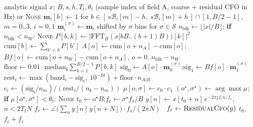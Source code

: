 \begin{algorithm}[H]
\caption{Float tone detector (\texttt{detect\_newman\_preamble}).}
\label{alg:tone_float}
\begin{algorithmic}[1]
\Require analytic signal $x$; $B, s, h, T_t, \theta_t$
\Ensure (sample index of field A, coarse $+$ residual CFO in Hz) or \textsc{None}
\State $\mathbf{m}_i[b] \gets 1$ for $b \in [\,s\mathcal{B}_i[m] - h,\ s\mathcal{B}_i[m] + h\,] \cap [1, B/2{-}1]$, $m = 0..3$, $i = 0, 1$
\State $\mathbf{m}_i^{(\sigma)} \gets \mathbf{m}_i$ shifted by $\sigma$ bins for $\sigma \in \mathcal{S}$ 
\State $n_{\mathrm{blk}} \gets \lfloor |x| / B \rfloor$; \textbf{if} $n_{\mathrm{blk}} < n_W$: \Return \textsc{None}
\State $P[b, k] \gets |\mathrm{FFT}_B(x[bB .. (b{+}1)B))[k]|^2$ 
\State $\mathrm{cum}[b] \gets \sum_{b' < b} P[b']$ 
\State $A[o] \gets \mathrm{cum}[o + n_A] - \mathrm{cum}[o]$;\quad $Bf[o] \gets \mathrm{cum}[o + n_W] - \mathrm{cum}[o + n_A]$, $o = 0..n_{\mathrm{blk}} - n_W$
\State $\mathrm{floor} \gets 0.01 \cdot \mathrm{median}_b \sum_{k=1}^{B/2-1} P[b,k]$ 
    \State $\mathrm{sig}_0 \gets A[o] \cdot \mathbf{m}_0^{(\sigma)}$;\quad $\mathrm{sig}_1 \gets Bf[o] \cdot \mathbf{m}_1^{(\sigma)}$ 
    \State $\mathrm{rest}_i \gets \max(\mathrm{band}_i - \mathrm{sig}_i,\ 10^{-10}) + \mathrm{floor} \cdot n_{A|B}$ 
    \State $c_i \gets (\mathrm{sig}_i / n_m) \big/ (\mathrm{rest}_i / (n_b - n_m))$ 
    \State $\mu[o, \sigma] \gets c_0 \cdot c_1$
\EndFor
\State $(o^\star, \sigma^\star) \gets \arg\max \mu$; \textbf{if} $\mu[o^\star, \sigma^\star] < \theta_t$: \Return \textsc{None}
\State $t_0 \gets o^\star B$;\quad $f_c \gets \sigma^\star f_s / B$ 
\State $y[n] \gets x[t_0 + n]\, e^{-2\pi j f_c n / f_s}$, $n < 2T_tN$ 
 $f_r \gets \angle\big(\sum_n \overline{y[n]}\, y[n{+}N]\big) \cdot f_s / (2\pi N)$ 
\Else\ $f_r \gets \textsc{ResidualCfo}(y)$ 
\EndIf
\State \Return $t_0$, $f_c + f_r$
\end{algorithmic}
\end{algorithm}

